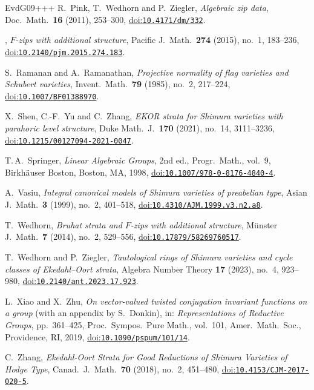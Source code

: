\documentclass[10pt,a4paper]{article}
\numberwithin{equation}{section}
\newcommand{\doi}[1]{\href{https://doi.org/#1}{doi:\nolinkurl{#1}}}
\theoremstyle{definition}
\theoremstyle{remark}
\begin{document}
\begin{thebibliography}{EvdG09+++}
R.~Pink, T.~Wedhorn and P.~Ziegler, \emph{Algebraic zip data}, Doc.\ Math.\
  \textbf{16} (2011), 253--300, 
\doi{10.4171/dm/332}.

\bysame, \emph{${F}$-zips with additional structure}, Pacific J.~Math.\
  \textbf{274} (2015), no.~1, 183--236, 
\doi{10.2140/pjm.2015.274.183}.

S.~Ramanan and A.~Ramanathan, \emph{Projective normality of flag varieties and
  {S}chubert varieties}, Invent.\ Math.\ \textbf{79} (1985), no.~2, 217--224,
\doi{10.1007/BF01388970}.

X.~Shen, C.-F.~Yu and C.~Zhang, \emph{E{KOR} strata for {S}himura varieties
  with parahoric level structure}, Duke Math.~J.\ \textbf{170} (2021), no.~14,
  3111--3236, 
\doi{10.1215/00127094-2021-0047}.

T.\,A.~Springer, \emph{Linear Algebraic Groups}, 2nd ed., Progr.\ Math.,
  vol.~9, Birkh\"auser Boston, Boston, MA, 1998, 
\doi{10.1007/978-0-8176-4840-4}.

A.~Vasiu, \emph{Integral canonical models of {S}himura varieties of preabelian
  type}, Asian J.~Math.\ \textbf{3} (1999), no.~2, 401--518,
\doi{10.4310/AJM.1999.v3.n2.a8}.

T.~Wedhorn, \emph{Bruhat strata and ${F}$-zips with additional structure},
  M\"unster J.~Math.\ \textbf{7} (2014), no.~2, 529--556, \doi{10.17879/58269760517}. 

\bibitem[WZ23]{Wedhorn-Ziegler-tautological}
T.~Wedhorn and P.~Ziegler, \emph{Tautological rings of {S}himura varieties and
  cycle classes of {E}kedahl--{O}ort strata}, Algebra Number Theory \textbf{17}
  (2023), no.~4, 923--980, \doi{10.2140/ant.2023.17.923}.

L.~Xiao and X.~Zhu, \emph{On vector-valued twisted conjugation invariant
  functions on a group} (with an appendix by S.~Donkin), in: \emph{Representations of Reductive Groups}, pp.~361--425, Proc.\ Sympos.\
  Pure Math., vol.~101, Amer.\ Math.\ Soc., Providence, RI, 2019,  
\doi{10.1090/pspum/101/14}.

\bibitem[Zha18]{Zhang-EO-Hodge}
C.~Zhang, \emph{Ekedahl-{O}ort Strata for Good Reductions of {S}himura
  Varieties of {H}odge Type}, Canad.~J.\ Math.\ \textbf{70} (2018), no.~2,
  451--480,
\doi{10.4153/CJM-2017-020-5}.

\end{thebibliography}
\end{document}

